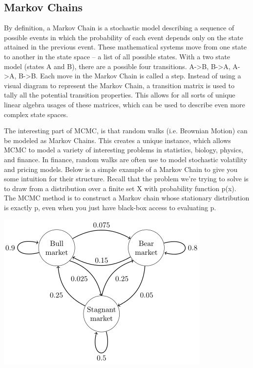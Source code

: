 \documentclass[letterpaper]{article}
\begin{document}
\subsection{Markov Chains}

By definition, a Markov Chain is a stochastic model describing a sequence of possible events in which the probability of each event depends only on the state attained in the previous event. These mathematical systems move from one state to another in the state space -- a list of all possible states. With a two state model (states A and B), there are a possible four transitions. A->B, B->A, A->A, B->B. Each move in the Markov Chain is called a step. Instead of using a visual diagram to represent the Markov Chain, a transition matrix is used to tally all the potential transition properties. This allows for all sorts of unique linear algebra usages of these matrices, which can be used to describe even more complex state spaces.\cite{grinstead1997}

The interesting part of MCMC, is that random walks (i.e. Brownian Motion) can be modeled as Markov Chains. This creates a unique instance, which allows MCMC to model a variety of interesting problems in statistics, biology, physics, and finance. In finance, random walks are often use to model stochastic volatility and pricing models. Below is a simple example of a Markov Chain to give you some intuition for their structure. Recall that the problem we’re trying to solve is to draw from a distribution over a finite set X with probability function p(x). The MCMC method is to construct a Markov chain whose stationary distribution is exactly p, even when you just have black-box access to evaluating p.
\begin{center}
	\includegraphics[scale=0.4]{Markov_Chain.png}
\end{center}
\end{document}
